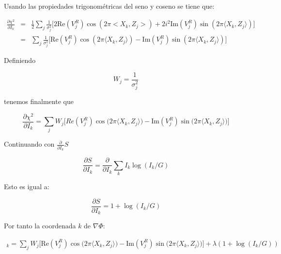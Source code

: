 Usando las propiedades trigonométricas del seno y coseno se tiene que:

\begin{eqnarray}
\frac{\partial\chi^{2}}{\partial I_{k}} & = & \frac{1}{2}\sum\limits_{j}\frac{1}{\sigma_{j}^{2}}\biggl[2\text{Re}(V_{j}^{R})\cos(2\pi <X_k,Z_j>)+2i^{2}\text{Im}(V_{j}^{R})\sin(2\pi \langle X_k,Z_j\rangle )\biggr] \\
                                      & = & \sum\limits_{j}\frac{1}{\sigma_{j}^{2}}\biggl[\text{Re}(V_{j}^{R}) \cos(2\pi\langle X_k,Z_j\rangle) - \text{Im}(V_{j}^{R})\sin(2\pi \langle X_k,Z_j\rangle)\biggr]
\end{eqnarray}

Definiendo

\begin{equation}
W_{j} = \frac{1}{\sigma_{j}^{2}}
\end{equation}

tenemos finalmente que

\begin{equation}
\frac{\partial\chi^{2}}{\partial I_{k}} = \sum\limits_{j}W_{j}\biggl[Re(V_{j}^{R})\cos\bigl(2\pi \langle X_k,Z_j\rangle\bigr)-\text{Im}(V_{j}^{R})\sin\bigl(2\pi \langle X_k,Z_j\rangle\bigr)\biggr]
\label{eq:dchi2}
\end{equation}

Continuando con $\frac{\partial}{\partial I_{k}}S$

\begin{equation}
\frac{\partial S}{\partial I_{k}} = \frac{\partial}{\partial I_{k}}\sum\limits_{k}I_{k}\log(I_{k}/G)
\end{equation}

Esto es igual a:


\begin{equation}
\frac{\partial S}{\partial I_{k}} = 1+\log(I_{k}/G)
\end{equation}


Por tanto la coordenada $k$ de $\nabla\Phi$:

\begin{multline}
[\nabla \Phi]_k = \sum\limits_{j}W_{j}\biggl[\text{Re}(V_{j}^{R})\cos\bigl(2\pi \langle X_k,Z_j \rangle\bigr)-\text{Im}(V_{j}^{R})\sin\bigl(2\pi \langle X_k,Z_j \rangle\bigr)\biggr] +
\lambda(1 + \log(I_{k}/G))
\label{eq:dphifinal}
\end{multline}
